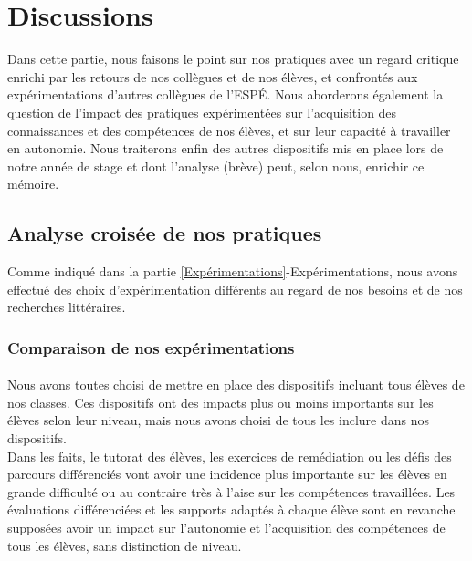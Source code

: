 \section{Discussions}
Dans cette partie, nous faisons le point sur nos pratiques avec un regard critique enrichi par les retours de nos collègues et de nos élèves, et confrontés aux expérimentations d'autres collègues de l'ESPÉ. Nous aborderons également la question de l'impact des pratiques expérimentées sur l'acquisition des connaissances et des compétences de nos élèves, et sur leur capacité à travailler en autonomie. Nous traiterons enfin des autres dispositifs mis en place lors de notre année de stage et dont l'analyse (brève) peut, selon nous, enrichir ce mémoire.
\subsection{Analyse croisée de nos pratiques}
Comme indiqué dans la partie \ref{Expérimentations}-Expérimentations, nous avons effectué des choix d'expérimentation différents au regard de nos besoins et de nos recherches littéraires.\\
\subsubsection{Comparaison de nos expérimentations}
\paragraph*{}Nous avons toutes choisi de mettre en place des dispositifs incluant tous élèves de nos classes. Ces dispositifs ont des impacts plus ou moins importants sur les élèves selon leur niveau, mais nous avons choisi de tous les inclure dans nos dispositifs.\\
Dans les faits, le tutorat des élèves, les exercices de remédiation ou les défis des parcours différenciés vont avoir une incidence plus importante sur les élèves en grande difficulté ou au contraire très à l'aise sur les compétences travaillées. Les évaluations différenciées et les supports adaptés à chaque élève sont en revanche supposées avoir un impact sur l'autonomie et l'acquisition des compétences de tous les élèves, sans distinction de niveau.\\
